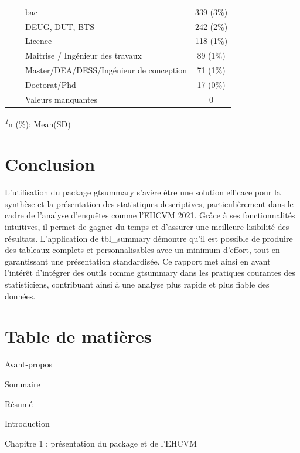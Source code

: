\documentclass[
]{article}
\begin{document}
\begin{table}[!t]
\begin{tabular*}{\linewidth}{@{\extracolsep{\fill}}lc}
    bac & 339 (3\%) \\ 
    DEUG, DUT, BTS & 242 (2\%) \\ 
    Licence & 118 (1\%) \\ 
    Maitrise / Ingénieur des travaux & 89 (1\%) \\ 
    Master/DEA/DESS/Ingénieur de conception & 71 (1\%) \\ 
    Doctorat/Phd & 17 (0\%) \\ 
    Valeurs manquantes & 0 \\ 
\bottomrule
\end{tabular*}
\begin{minipage}{\linewidth}
\textsuperscript{\textit{1}}n (\%); Mean(SD)\\
\end{minipage}
\end{table}

\newpage

\section*{Conclusion}

L'utilisation du package gtsummary s'avère être une solution efficace
pour la synthèse et la présentation des statistiques descriptives,
particulièrement dans le cadre de l'analyse d'enquêtes comme l'EHCVM
2021. Grâce à ses fonctionnalités intuitives, il permet de gagner du
temps et d'assurer une meilleure lisibilité des résultats. L'application
de tbl\_summary démontre qu'il est possible de produire des tableaux
complets et personnalisables avec un minimum d'effort, tout en
garantissant une présentation standardisée. Ce rapport met ainsi en
avant l'intérêt d'intégrer des outils comme gtsummary dans les pratiques
courantes des statisticiens, contribuant ainsi à une analyse plus rapide
et plus fiable des données.

\newpage

\section*{Table de matières}

Avant-propos

Sommaire

Résumé

Introduction

Chapitre 1 : présentation du package et de l'EHCVM
\end{document}
